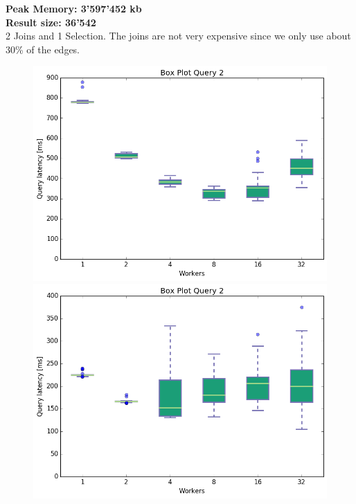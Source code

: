 \documentclass[11pt,singlecolumn]{scrartcl}
\begin{document}
\textbf{Peak Memory: 3'597'452 kb}\\
\textbf{Result size: 36'542}\\
2 Joins and 1 Selection. The joins are not very expensive since we only use about 30\% of the edges.
\clearpage
\begin{figure}[!tbp]
  \centering
  \RawFloats
  \begin{minipage}[b]{0.5\textwidth}
    \includegraphics[width=\textwidth]{boxesfl/q2}
  \end{minipage}
  \hfill
  \begin{minipage}[b]{0.5\textwidth}
    \includegraphics[width=\textwidth]{boxesfs/q2}
  \end{minipage}
\end{figure}
\end{document}
